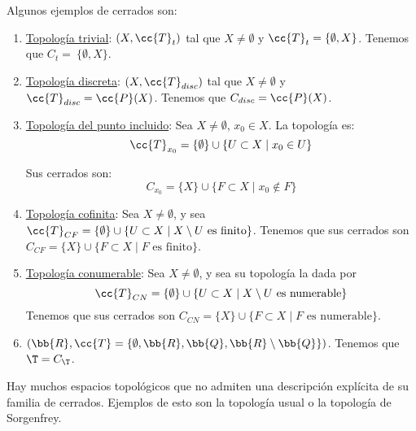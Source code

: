 \begin{ejemplo}
    Algunos ejemplos de cerrados son:
    \begin{enumerate}
        \item \ul{Topología trivial}: $(X,\cc{T}_t)$ tal que $X\neq \emptyset$ y $\cc{T}_t=\{\emptyset, X\}$. Tenemos que $C_t=~\{\emptyset, X\}$.

        \item \ul{Topología discreta}: $(X,\cc{T}_{disc})$ tal que $X\neq \emptyset$ y $\cc{T}_{disc}=\cc{P}(X)$. Tenemos que $C_{disc}=\cc{P}(X)$.

        \item \ul{Topología del punto incluido}: Sea $X\neq \emptyset$, $x_0\in X$. La topología es:
        \begin{equation*}
            \cc{T}_{x_0}=\{\emptyset\}\cup \{U\subset X\mid x_0\in U\}
        \end{equation*}

        Sus cerrados son:
        \begin{equation*}
            C_{x_0}=\{X\}\cup \{F\subset X\mid x_0\notin F\}
        \end{equation*}

        \item \ul{Topología cofinita}: Sea $X\neq \emptyset$, y sea $\cc{T}_{CF}=\{\emptyset\}\cup \{U\subset X\mid X\setminus U \text{ es finito}\}$. Tenemos que sus cerrados son $C_{CF}=\{X\}\cup \{F\subset X\mid F \text{ es finito}\}$.

        \item \ul{Topología conumerable}: Sea $X\neq \emptyset$, y sea su topología la dada por $$\cc{T}_{CN}=\{\emptyset\}\cup \{U\subset X\mid X\setminus U \text{ es numerable}\}$$
        Tenemos que sus cerrados son $C_{CN}=\{X\}\cup \{F\subset X\mid F \text{ es numerable}\}$.

        \item $(\bb{R}, \cc{T}=\{\emptyset, \bb{R}, \bb{Q}, \bb{R}\setminus \bb{Q}\})$. Tenemos que $\T=C_\T$.
    \end{enumerate}
    Hay muchos espacios topológicos que no admiten una descripción explícita de su familia de cerrados. Ejemplos de esto son la topología usual o la topología de Sorgenfrey.
\end{ejemplo}


